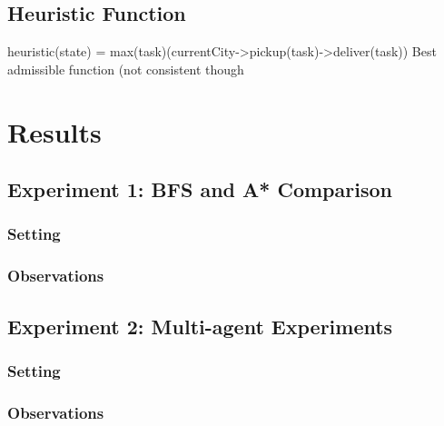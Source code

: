 \documentclass[11pt]{article}
\begin{document}
\subsection{Heuristic Function}

heuristic(state) = max(task)(currentCity->pickup(task)->deliver(task))
Best admissible function (not consistent though


\section{Results}

\subsection{Experiment 1: BFS and A* Comparison}

\subsubsection{Setting}

\subsubsection{Observations}


\subsection{Experiment 2: Multi-agent Experiments}

\subsubsection{Setting}

\subsubsection{Observations}
\end{document}
